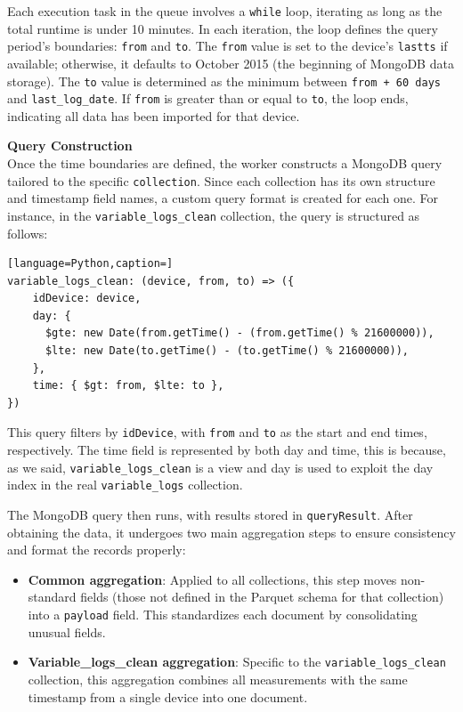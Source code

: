 Each execution task in the queue involves a \texttt{while} loop, iterating as long as the total runtime is under 10 minutes. In each iteration, the loop defines the query period's boundaries: \texttt{from} and \texttt{to}. The \texttt{from} value is set to the device's \texttt{lastts} if available; otherwise, it defaults to October 2015 (the beginning of MongoDB data storage). The \texttt{to} value is determined as the minimum between \texttt{from + 60 days} and \texttt{last\_log\_date}. If \texttt{from} is greater than or equal to \texttt{to}, the loop ends, indicating all data has been imported for that device.

\textbf{Query Construction} \\
Once the time boundaries are defined, the worker constructs a MongoDB query tailored to the specific \texttt{collection}. Since each collection has its own structure and timestamp field names, a custom query format is created for each one. For instance, in the \texttt{variable\_logs\_clean} collection, the query is structured as follows:

\begin{lstlisting}[language=Python,caption=]
variable_logs_clean: (device, from, to) => ({
    idDevice: device,
    day: {
      $gte: new Date(from.getTime() - (from.getTime() % 21600000)),
      $lte: new Date(to.getTime() - (to.getTime() % 21600000)),
    },
    time: { $gt: from, $lte: to },
})
\end{lstlisting}

This query filters by \texttt{idDevice}, with \texttt{from} and \texttt{to} as the start and end times, respectively. The time field is represented by both day and time, this is because, as we said, \texttt{variable\_logs\_clean} is a view and day is used to exploit the day index in the real \texttt{variable\_logs} collection.

The MongoDB query then runs, with results stored in \texttt{queryResult}. After obtaining the data, it undergoes two main aggregation steps to ensure consistency and format the records properly:

\begin{itemize}
    \item \textbf{Common aggregation}: Applied to all collections, this step moves non-standard fields (those not defined in the Parquet schema for that collection) into a \texttt{payload} field. This standardizes each document by consolidating unusual fields.
    \item \textbf{Variable\_logs\_clean aggregation}: Specific to the \texttt{variable\_logs\_clean} collection, this aggregation combines all measurements with the same timestamp from a single device into one document.
\end{itemize}

